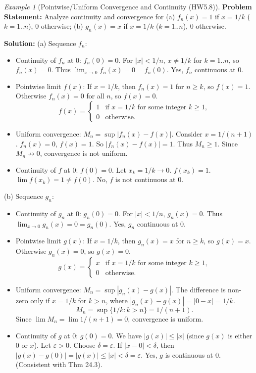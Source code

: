 \documentclass{article}
\theoremstyle{definition}
\theoremstyle{plain}
\theoremstyle{remark}
\newtheorem{example}{Example}[section]
\newcommand{\eps}{\varepsilon}
\begin{document}
\begin{example}[Pointwise/Uniform Convergence and Continuity (HW5.8)]
\textbf{Problem Statement:} Analyze continuity and convergence for (a) \(f_n(x) = 1\) if \(x=1/k\) (\(k=1..n\)), 0 otherwise; (b) \(g_n(x) = x\) if \(x=1/k\) (\(k=1..n\)), 0 otherwise.

\textbf{Solution:}
(a) Sequence \(f_n\):
    \begin{itemize}
        \item Continuity of \(f_n\) at 0: \(f_n(0)=0\). For \(|x|<1/n\), \(x \ne 1/k\) for \(k=1..n\), so \(f_n(x)=0\). Thus \(\lim_{x\to 0} f_n(x) = 0 = f_n(0)\). Yes, \(f_n\) continuous at 0.
        \item Pointwise limit \(f(x)\): If \(x=1/k\), then \(f_n(x)=1\) for \(n \ge k\), so \(f(x)=1\). Otherwise \(f_n(x)=0\) for all \(n\), so \(f(x)=0\).
        \[ f(x) = \begin{cases} 1 & \text{if } x=1/k \text{ for some integer } k \ge 1, \\ 0 & \text{otherwise.} \end{cases} \]
        \item Uniform convergence: \(M_n = \sup |f_n(x)-f(x)|\). Consider \(x=1/(n+1)\). \(f_n(x)=0\), \(f(x)=1\). So \(|f_n(x)-f(x)|=1\). Thus \(M_n \ge 1\). Since \(M_n \not\to 0\), convergence is not uniform.
        \item Continuity of \(f\) at 0: \(f(0)=0\). Let \(x_k = 1/k \to 0\). \(f(x_k)=1\). \(\lim f(x_k)=1 \ne f(0)\). No, \(f\) is not continuous at 0.
    \end{itemize}
(b) Sequence \(g_n\):
    \begin{itemize}
        \item Continuity of \(g_n\) at 0: \(g_n(0)=0\). For \(|x|<1/n\), \(g_n(x)=0\). Thus \(\lim_{x\to 0} g_n(x) = 0 = g_n(0)\). Yes, \(g_n\) continuous at 0.
        \item Pointwise limit \(g(x)\): If \(x=1/k\), then \(g_n(x)=x\) for \(n \ge k\), so \(g(x)=x\). Otherwise \(g_n(x)=0\), so \(g(x)=0\).
        \[ g(x) = \begin{cases} x & \text{if } x=1/k \text{ for some integer } k \ge 1, \\ 0 & \text{otherwise.} \end{cases} \]
        \item Uniform convergence: \(M_n = \sup |g_n(x)-g(x)|\). The difference is non-zero only if \(x=1/k\) for \(k>n\), where \(|g_n(x)-g(x)| = |0-x| = 1/k\).
        \[ M_n = \sup \{ 1/k : k > n \} = 1/(n+1). \]
        Since \(\lim M_n = \lim 1/(n+1) = 0\), convergence is uniform.
        \item Continuity of \(g\) at 0: \(g(0)=0\). We have \(|g(x)| \le |x|\) (since \(g(x)\) is either 0 or \(x\)). Let \(\eps>0\). Choose \(\delta=\eps\). If \(|x-0|<\delta\), then \(|g(x)-g(0)| = |g(x)| \le |x| < \delta = \eps\). Yes, \(g\) is continuous at 0. (Consistent with Thm 24.3).
    \end{itemize}
\end{example}
\end{document}
